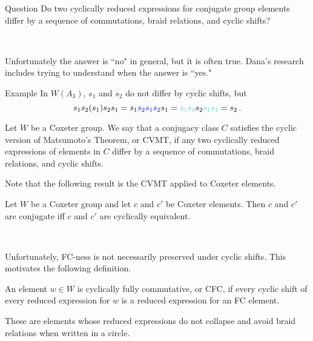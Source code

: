 \documentclass[9pt]{beamer}
\begin{document}
\begin{frame}
\begin{block}{Question}
Do two cyclically reduced expressions for conjugate group elements differ by a sequence of commutations, braid relations, and cyclic shifts?
\end{block} ~\\
    \pause

    Unfortunately the answer is ``no" in general, but it is often true. Dana's research includes trying to understand when the answer is ``yes."
    
\begin{block}{Example} In $W(A_3)$, $s_1$ and $s_2$ do not differ by cyclic shifts, but
$$s_1s_2(s_1)s_2s_1=s_1{\color{blue}s_2s_1s_2}s_1={\color{turq}s_1s_1}s_2{\color{turq}s_1s_1}=s_2\,.$$
\end{block}
    \pause

\begin{definition} Let $W$ be a Coxeter group. We say that a conjugacy class $C$ satisfies the \alert{cyclic version of Matsumoto's Theorem}, or CVMT, if any two cyclically reduced expressions of elements in $C$ differ by a sequence of commutations, braid relations, and cyclic shifts.
\end{definition}
\end{frame}

\begin{frame}
    Note that the following result is the CVMT applied to Coxeter elements.

\begin{theorem} Let $W$ be a Coxeter group and let $c$ and $c'$ be Coxeter elements. Then $c$ and $c'$ are conjugate iff $c$ and $c'$ are cyclically equivalent.
\end{theorem} ~\\
    \pause

    Unfortunately, FC-ness is not necessarily preserved under cyclic shifts. This motivates the following definition.

\begin{definition} An element $w \in W$ is \alert{cyclically fully commutative}, or CFC, if every cyclic shift of every reduced expression for $w$ is a reduced expression for an FC element.
\end{definition}

    These are elements whose reduced expressions do not collapse and avoid braid relations when written in a circle.
\end{frame}
\end{document}
